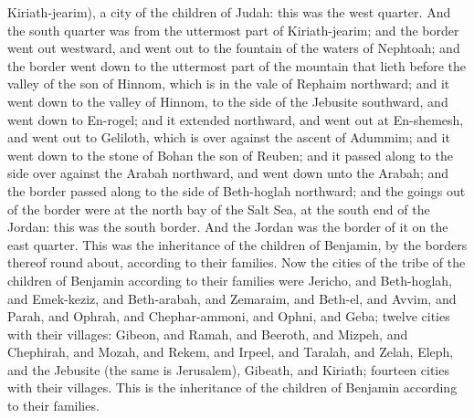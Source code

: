 Kiriath-jearim), a city of the children of Judah: this was the west quarter. And the south quarter was from the uttermost part of Kiriath-jearim; and the border went out westward, and went out to the fountain of the waters of Nephtoah; and the border went down to the uttermost part of the mountain that lieth before the valley of the son of Hinnom, which is in the vale of Rephaim northward; and it went down to the valley of Hinnom, to the side of the Jebusite southward, and went down to En-rogel; and it extended northward, and went out at En-shemesh, and went out to Geliloth, which is over against the ascent of Adummim; and it went down to the stone of Bohan the son of Reuben; and it passed along to the side over against the Arabah northward, and went down unto the Arabah; and the border passed along to the side of Beth-hoglah northward; and the goings out of the border were at the north bay of the Salt Sea, at the south end of the Jordan: this was the south border. And the Jordan was the border of it on the east quarter. This was the inheritance of the children of Benjamin, by the borders thereof round about, according to their families.  Now the cities of the tribe of the children of Benjamin according to their families were Jericho, and Beth-hoglah, and Emek-keziz, and Beth-arabah, and Zemaraim, and Beth-el, and Avvim, and Parah, and Ophrah, and Chephar-ammoni, and Ophni, and Geba; twelve cities with their villages: Gibeon, and Ramah, and Beeroth, and Mizpeh, and Chephirah, and Mozah, and Rekem, and Irpeel, and Taralah, and Zelah, Eleph, and the Jebusite (the same is Jerusalem), Gibeath, and Kiriath; fourteen cities with their villages. This is the inheritance of the children of Benjamin according to their families. 

